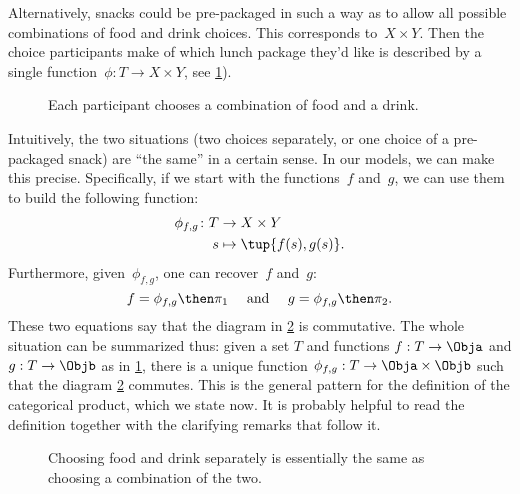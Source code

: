 Alternatively, snacks could be pre-packaged in such a way as to allow all possible combinations of food and drink choices. This corresponds to~$X\times Y$.
Then the choice participants make of which lunch package they'd like is described by a single function~$\phi\colon T\to X\times Y$, see \cref{fig:snacks_2}).

\begin{figure}[h!]
    \begin{center}
    \end{center}
    \caption{Each participant chooses a combination of food and a drink. \label{fig:snacks_2}}
\end{figure}

Intuitively, the two situations (two choices separately, or one choice of a pre-packaged snack) are ``the same'' in a certain sense.
In our models, we can make this precise.
Specifically, if we start with the functions~$f$ and~$g$, we can use them to build the following function:
\begin{equation*}
    \begin{aligned}
        \phi_{f,g}\colon T&\to X\times Y\\
        s&\mapsto \tup{f(s),g(s)}.
    \end{aligned}
\end{equation*}
Furthermore, given~$\phi_{f,g}$, one can recover~$f$ and~$g$:
\begin{equation*}
    f=\phi_{f,g}\then \pi_1 \quad  \text{ and } \quad g=\phi_{f,g}\then \pi_2.
\end{equation*}
These two equations say that the diagram in \cref{fig:snacks_3} is commutative.
The whole situation can be summarized thus: given a set $T$ and functions $f: T \rightarrow \Obja$ and $g: T \rightarrow \Objb$ as in \cref{fig:snacks_2}, there is a unique function $\phi_{f,g} : T \rightarrow \Obja \times \Objb$ such that the diagram \cref{fig:snacks_3} commutes.
This is the general pattern for the definition of the categorical product, which we state now.
It is probably helpful to read the definition together with the clarifying remarks that follow it.

\begin{figure}[h!]
    \begin{center}
    \end{center}
    \caption{Choosing food and drink separately is essentially the same as choosing a combination of the two. \label{fig:snacks_3}}
\end{figure}






